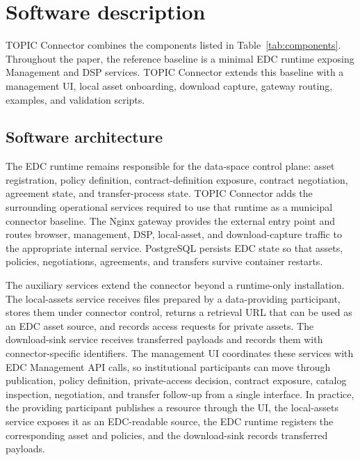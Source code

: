 \documentclass[a4paper,fleqn]{cas-dc}
\begin{document}
\section{Software description}
TOPIC Connector combines the components listed in Table~\ref{tab:components}. Throughout the paper, the reference baseline is a minimal EDC runtime exposing Management and DSP services. TOPIC Connector extends this baseline with a management UI, local asset onboarding, download capture, gateway routing, examples, and validation scripts.

\subsection{Software architecture}

 The EDC runtime remains responsible for the data-space control plane: asset registration, policy definition, contract-definition exposure, contract negotiation, agreement state, and transfer-process state. TOPIC Connector adds the surrounding operational services required to use that runtime as a municipal connector baseline. The Nginx gateway provides the external entry point and routes browser, management, DSP, local-asset, and download-capture traffic to the appropriate internal service. PostgreSQL persists EDC state so that assets, policies, negotiations, agreements, and transfers survive container restarts.

The auxiliary services extend the connector beyond a runtime-only installation. The local-assets service receives files prepared by a data-providing participant, stores them under connector control, returns a retrieval URL that can be used as an EDC asset source, and records access requests for private assets. The download-sink service receives transferred payloads and records them with connector-specific identifiers. The management UI coordinates these services with EDC Management API calls, so institutional participants can move through publication, policy definition, private-access decision, contract exposure, catalog inspection, negotiation, and transfer follow-up from a single interface. In practice, the providing participant publishes a resource through the UI, the local-assets service exposes it as an EDC-readable source, the EDC runtime registers the corresponding asset and policies, and the download-sink records transferred payloads.
\end{document}
